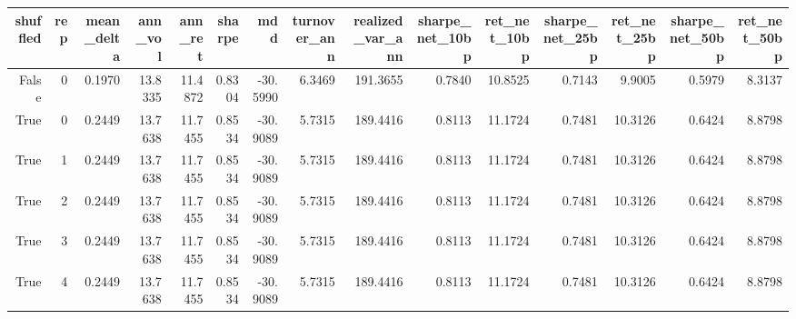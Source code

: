\begin{tabular}{rrrrrrrrrrrrrrr}
\toprule
shuffled & rep & mean_delta & ann_vol & ann_ret & sharpe & mdd & turnover_ann & realized_var_ann & sharpe_net_10bp & ret_net_10bp & sharpe_net_25bp & ret_net_25bp & sharpe_net_50bp & ret_net_50bp \\
\midrule
False & 0 & 0.1970 & 13.8335 & 11.4872 & 0.8304 & -30.5990 & 6.3469 & 191.3655 & 0.7840 & 10.8525 & 0.7143 & 9.9005 & 0.5979 & 8.3137 \\
True & 0 & 0.2449 & 13.7638 & 11.7455 & 0.8534 & -30.9089 & 5.7315 & 189.4416 & 0.8113 & 11.1724 & 0.7481 & 10.3126 & 0.6424 & 8.8798 \\
True & 1 & 0.2449 & 13.7638 & 11.7455 & 0.8534 & -30.9089 & 5.7315 & 189.4416 & 0.8113 & 11.1724 & 0.7481 & 10.3126 & 0.6424 & 8.8798 \\
True & 2 & 0.2449 & 13.7638 & 11.7455 & 0.8534 & -30.9089 & 5.7315 & 189.4416 & 0.8113 & 11.1724 & 0.7481 & 10.3126 & 0.6424 & 8.8798 \\
True & 3 & 0.2449 & 13.7638 & 11.7455 & 0.8534 & -30.9089 & 5.7315 & 189.4416 & 0.8113 & 11.1724 & 0.7481 & 10.3126 & 0.6424 & 8.8798 \\
True & 4 & 0.2449 & 13.7638 & 11.7455 & 0.8534 & -30.9089 & 5.7315 & 189.4416 & 0.8113 & 11.1724 & 0.7481 & 10.3126 & 0.6424 & 8.8798 \\
\bottomrule
\end{tabular}

